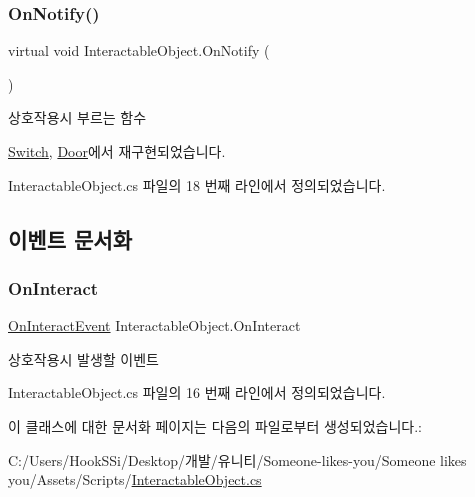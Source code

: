 \subsubsection{\texorpdfstring{OnNotify()}{OnNotify()}}
{\footnotesize\ttfamily virtual void Interactable\+Object.\+On\+Notify (\begin{DoxyParamCaption}{ }\end{DoxyParamCaption})\hspace{0.3cm}{\ttfamily [virtual]}}



상호작용시 부르는 함수 



\mbox{\hyperlink{class_switch_a19366c58c24da5801977ecc108270c5a}{Switch}}, \mbox{\hyperlink{class_door_a12cc0e80dc33ddd336dccc52466c2c50}{Door}}에서 재구현되었습니다.



Interactable\+Object.\+cs 파일의 18 번째 라인에서 정의되었습니다.


\begin{DoxyCode}{0}

\end{DoxyCode}


\subsection{이벤트 문서화}
\mbox{\label{class_interactable_object_afe5e0b16d86c2ed4abf4a71a1995f7ae}} 
\subsubsection{\texorpdfstring{OnInteract}{OnInteract}}
{\footnotesize\ttfamily \mbox{\hyperlink{class_interactable_object_a70a579e4b09d53e6cb77b5222189d5eb}{On\+Interact\+Event}} Interactable\+Object.\+On\+Interact}



상호작용시 발생할 이벤트 



Interactable\+Object.\+cs 파일의 16 번째 라인에서 정의되었습니다.



이 클래스에 대한 문서화 페이지는 다음의 파일로부터 생성되었습니다.\+:\begin{DoxyCompactItemize}
\item 
C\+:/\+Users/\+Hook\+S\+Si/\+Desktop/개발/유니티/\+Someone-\/likes-\/you/\+Someone likes you/\+Assets/\+Scripts/\mbox{\hyperlink{_interactable_object_8cs}{Interactable\+Object.\+cs}}\end{DoxyCompactItemize}
